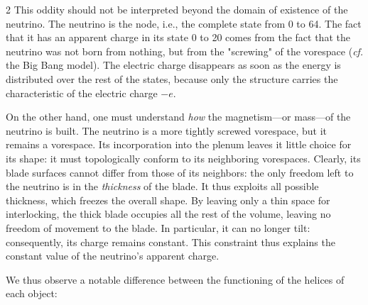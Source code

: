 \begin{multicols}{2}
	This oddity should not be interpreted beyond the domain of existence of the neutrino. The neutrino is the  node, i.e., the complete state from 0 to 64. The fact that it has an apparent charge in its state 0 to 20 comes from the fact that the neutrino was not born from nothing, but from the "screwing" of the vorespace (\textit{cf.} the Big Bang model). The electric charge disappears as soon as the energy is distributed over the rest of the states, because only the  structure carries the characteristic of the electric charge $-e$.
	
	On the other hand, one must understand \textit{how} the magnetism—or mass—of the neutrino is built. The neutrino is a more tightly screwed vorespace, but it remains a vorespace. Its incorporation into the plenum leaves it little choice for its shape: it must topologically conform to its neighboring vorespaces. Clearly, its blade surfaces cannot differ from those of its neighbors: the only freedom left to the neutrino is in the \textit{thickness} of the blade. It thus exploits all possible thickness, which freezes the overall shape. By leaving only a thin space for interlocking, the thick blade occupies all the rest of the volume, leaving no freedom of movement to the blade. In particular, it can no longer tilt: consequently, its charge remains constant. This constraint thus explains the constant value of the neutrino's apparent charge.
	
	We thus observe a notable difference between the functioning of the helices of each object:
	
	\begin{center}
\end{center}
\end{multicols}
